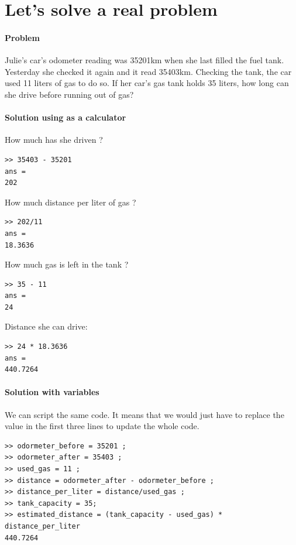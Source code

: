 \section{Let's solve a real problem}

	\paragraph*{Problem}
		\label{problem-julie}
		Julie's car's odometer reading was 35201km when she last filled the fuel tank. 
		Yesterday she checked it again and it read 35403km. Checking the tank, the car used 11 liters of gas to do so.
		If her car's gas tank holds 35 liters, how long can she drive before running out of gas? 

	\paragraph*{Solution using \matlab as a calculator}
		How much has she driven ?
\begin{lstlisting}
>> 35403 - 35201
ans =
202
\end{lstlisting}
		How much distance per liter of gas ?
\begin{lstlisting}
>> 202/11
ans =
18.3636
\end{lstlisting}
		How much gas is left in the tank ?
\begin{lstlisting}
>> 35 - 11
ans =
24
\end{lstlisting}
	Distance she can drive:
\begin{lstlisting}
>> 24 * 18.3636
ans =
440.7264
\end{lstlisting}

	\paragraph*{Solution with variables}
		We can script the same code. It means that we would just have to replace the value in the first three lines to update the whole code. 
\begin{lstlisting}
>> odormeter_before = 35201 ;
>> odormeter_after = 35403 ; 
>> used_gas = 11 ;
>> distance = odormeter_after - odormeter_before ;  
>> distance_per_liter = distance/used_gas ;
>> tank_capacity = 35;
>> estimated_distance = (tank_capacity - used_gas) * distance_per_liter
440.7264
\end{lstlisting}



